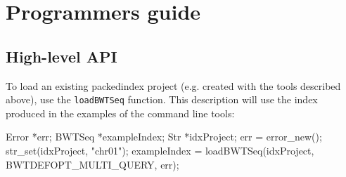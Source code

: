 \documentclass[12pt,titlepage]{article}
\begin{document}
\section{Programmers guide}
\label{sec:packedindex:progguide}

\subsection{High-level API}
\label{sec:packedindex:proguide:highlvl}

\newcommand{\funcName}[1]{\texttt{#1}}
\lstset{language=C,frame=single,}%

To load an existing packedindex project (e.g. created with the tools
described above), use the \funcName{loadBWTSeq} function. This
description will use the  index produced in the
examples of the command line tools:
\begin{listing}
{
  Error *err;
  BWTSeq *exampleIndex;
  Str *idxProject;
  err = error_new();
  str_set(idxProject, "chr01");
  exampleIndex = loadBWTSeq(idxProject, BWTDEFOPT_MULTI_QUERY, err);
}
\end{listing}



\end{document}

